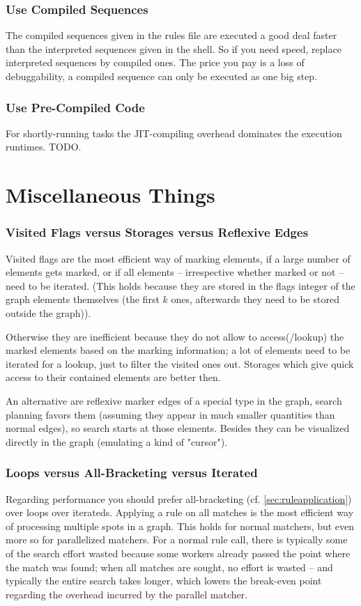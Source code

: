 \subsubsection*{Use Compiled Sequences}
The compiled sequences given in the rules file are executed a good deal faster than the interpreted sequences given in the shell.
So if you need speed, replace interpreted sequences by compiled ones.
The price you pay is a loss of debuggability, a compiled sequence can only be executed as one big step.

\subsubsection*{Use Pre-Compiled Code}
For shortly-running tasks the JIT-compiling overhead dominates the execution runtimes.
TODO.


\section{Miscellaneous Things}

\subsubsection*{Visited Flags versus Storages versus Reflexive Edges}
Visited flags are the most efficient way of marking elements, if a large number of elements gets marked, or if all elements -- irrespective whether marked or not -- need to be iterated.
(This holds because they are stored in the flags integer of the graph elements themselves (the first $k$ ones, afterwards they need to be stored outside the graph)).

Otherwise they are inefficient because they do not allow to access(/lookup) the marked elements based on the marking information;
a lot of elements need to be iterated for a lookup, just to filter the visited ones out.
Storages which give quick access to their contained elements are better then.

An alternative are reflexive marker edges of a special type in the graph, search planning favors them (assuming they appear in much smaller quantities than normal edges),  so search starts at those elements. 
Besides they can be visualized directly in the graph (emulating a kind of "cursor").

\subsubsection*{Loops versus All-Bracketing versus Iterated}
Regarding performance you should prefer all-bracketing (cf. \ref{sec:ruleapplication}) over loops over iterateds.
Applying a rule on all matches is the most efficient way of processing multiple spots in a graph.
This holds for normal matchers, but even more so for parallelized matchers.
For a normal rule call, there is typically some of the search effort wasted because some workers already passed the point where the match was found; when all matches are sought, no effort is wasted -- and typically the entire search takes longer, which lowers the break-even point regarding the overhead incurred by the parallel matcher.

